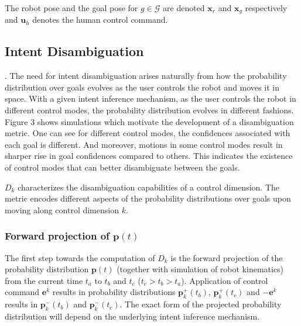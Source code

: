 The robot pose and the goal pose for $g \in \mathcal{G}$ are denoted $\boldsymbol{x}_r$ and $\boldsymbol{x}_g$ respectively and $\boldsymbol{u}_h$ denotes the human control command.
\subsection{Intent Disambiguation}\label{ssec:disamb}. 
The need for intent disambiguation arises naturally from how the probability distribution over goals evolves as the user controls the robot and moves it in space. With a given intent inference mechanism, as the user controls the robot in different control modes, the probability distribution evolves in different fashions. Figure 3 shows simulations which motivate the development of a disambiguation metric. One can see for different control modes, the confidences associated with each goal is different. And moreover, motions in some control modes result in sharper rise in goal confidences compared to others. This indicates the existence of control modes that can better disambiguate between the goals. 

$D_k$ characterizes the disambiguation capabilities of a control dimension. The metric encodes different aspects of the probability distributions over goals upon moving along control dimension $k$. 

\subsubsection{Forward projection of $\boldsymbol{p}(t)$}
The first step towards the computation of $D_k$ is the forward projection of the probability distribution $\boldsymbol{p}(t)$ (together with simulation of robot kinematics) from the current time $t_a$ to $t_b$ and $t_c$ ($t_c > t_b > t_a$). Application of control command $\boldsymbol{e}^k$ results in probability distributions $\boldsymbol{p}^+_k(t_b)$, $\boldsymbol{p}^+_k(t_c)$ and $-\boldsymbol{e}^k$ results in $\boldsymbol{p}^-_k(t_b)$ and $\boldsymbol{p}^-_k(t_c)$. The exact form of the projected probability distribution will depend on the underlying intent inference mechanism. 

